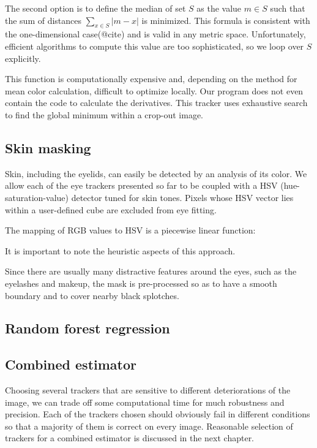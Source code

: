 The second option is to define the median of set $S$ as the value $m \in S$ such that the sum of distances $\sum_{x \in S} |m - x|$ is minimized.
This formula is consistent with the one-dimensional case(@cite) and is valid in any metric space.
Unfortunately, efficient algorithms to compute this value are too sophisticated, so we loop over $S$ explicitly.

This function is computationally expensive and, depending on the method for mean color calculation, difficult to optimize locally.
Our program does not even contain the code to calculate the derivatives.
This tracker uses exhaustive search to find the global minimum within a crop-out image.

\subsection{Skin masking}

Skin, including the eyelids, can easily be detected by an analysis of its color.
We allow each of the eye trackers presented so far to be coupled with a HSV (hue-saturation-value) detector tuned for skin tones.
Pixels whose HSV vector lies within a user-defined cube are excluded from eye fitting.

The mapping of RGB values to HSV is a piecewise linear function:

It is important to note the heuristic aspects of this approach.

Since there are usually many distractive features around the eyes, such as the eyelashes and makeup, the mask is pre-processed so as to have a smooth boundary and to cover nearby black splotches.


\subsection{Random forest regression}

\subsection{Combined estimator}

Choosing several trackers that are sensitive to different deteriorations of the image, we can trade off some computational time for much robustness and precision.
Each of the trackers chosen should obviously fail in different conditions so that a majority of them is correct on every image.
Reasonable selection of trackers for a combined estimator is discussed in the next chapter.

